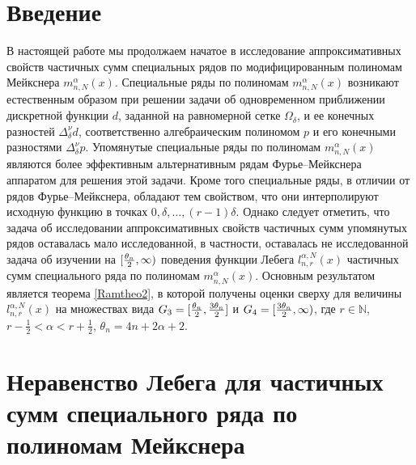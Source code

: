 \section{Введение}
В настоящей работе мы продолжаем начатое в \cite{RamVMJ} исследование аппроксимативных свойств
частичных сумм специальных рядов по модифицированным полиномам Мейкснера $m_{n,N}^\alpha(x)$.
Специальные ряды по полиномам $m_{n,N}^\alpha(x)$ возникают естественным образом при решении задачи об одновременном приближении дискретной функции $d$, заданной на равномерной сетке $\Omega_\delta$, и ее конечных разностей $\Delta^\nu_\delta d$, соответственно алгебраическим полиномом $p$ и его конечными разностями $\Delta^\nu_\delta p$. Упомянутые специальные ряды по полиномам $m_{n,N}^\alpha(x)$ являются более эффективным альтернативным рядам Фурье--Мейкснера аппаратом для решения этой задачи. Кроме того специальные ряды, в отличии от рядов Фурье--Мейкснера, обладают тем свойством, что они интерполируют исходную функцию в точках $0, \delta, \ldots, (r-1)\delta$.
Однако следует отметить, что задача об исследовании аппроксимативных свойств частичных сумм упомянутых рядов оставалась мало исследованной, в частности, оставалась не исследованной задача об изучении на $[{\theta_n\over 2},\infty)$  поведения функции Лебега $l_{n,r}^{\alpha,N}(x)$ частичных сумм специального ряда по полиномам $m_{n,N}^\alpha(x)$. Основным результатом является теорема \ref{Ramtheo2}, в которой получены оценки сверху для величины $l_{n,r}^{\alpha,N}(x)$ на множествах вида $G_3=[{\theta_n\over 2},{3\theta_n\over 2}]$ и $G_4=[{3\theta_n\over 2},\infty)$, где $r\in\mathbb{N}$, $r-\frac{1}{2}<\alpha<r+\frac{1}{2}$, $\theta_n=4n+2\alpha+2$.

\section{Неравенство Лебега для частичных сумм специального ряда по полиномам Мейкснера}

